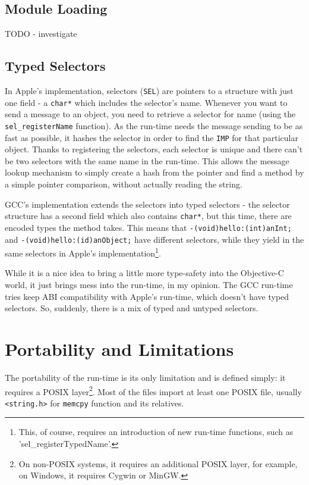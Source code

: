 \subsection{Module Loading}

TODO - investigate

\subsection{Typed Selectors}

In Apple's implementation, selectors (\verb=SEL=) are pointers to a structure with just one field - a \verb=char*= which includes the selector's name. Whenever you want to send a message to an object, you need to retrieve a selector for name (using the \verb=sel_registerName= function). As the run-time needs the message sending to be as fast as possible, it hashes the selector in order to find the \verb=IMP= for that particular object. Thanks to registering the selectors, each selector is unique and there can't be two selectors with the same name in the run-time. This allows the message lookup mechanism to simply create a hash from the pointer and find a method by a simple pointer comparison, without actually reading the string.

GCC's implementation extends the selectors into typed selectors - the selector structure has a second field which also contains \verb=char*=, but this time, there are encoded types the method takes. This means that \verb=-(void)hello:(int)anInt;= and \verb=-(void)hello:(id)anObject;= have different selectors, while they yield in the same selectors in Apple's implementation\footnote{This, of course, requires an introduction of new run-time functions, such as 'sel\_registerTypedName'.}.

While it is a nice idea to bring a little more type-safety into the Objective-C world, it just brings mess into the run-time, in my opinion. The GCC run-time tries keep ABI compatibility with Apple's run-time, which doesn't have typed selectors. So, suddenly, there is a mix of typed and untyped selectors.

\section{Portability and Limitations}

The portability of the run-time is its only limitation and is defined simply: it requires a POSIX layer\footnote{On non-POSIX systems, it requires an additional POSIX layer, for example, on Windows, it requires Cygwin or MinGW.}. Most of the files import at least one POSIX file, usually \verb=<string.h>= for \verb=memcpy= function and its relatives.

